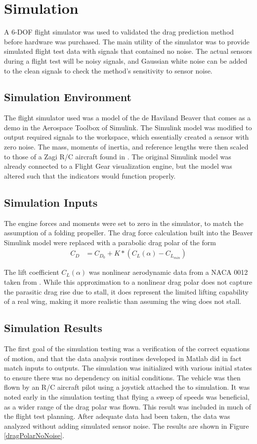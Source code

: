 \chapter{Simulation}
\label{simulation}
A 6-DOF flight simulator was used to validated the drag prediction method before hardware was purchased. The main utility of the simulator was to provide simulated flight test data with signals that contained no noise. The actual sensors during a flight test will be noisy signals, and Gaussian white noise can be added to the clean signals to check the method's sensitivity to sensor noise.

\section{Simulation Environment}
The flight simulator used was a model of the de Haviland Beaver that comes as a demo in the Aerospace Toolbox of Simulink. The Simulink model was modified to output required signals to the workspace, which essentially created a sensor with zero noise. The mass, moments of inertia, and reference lengths were then scaled to those of a Zagi R/C aircraft found in \cite{stevens2003aircraft}. The original Simulink model was already connected to a Flight Gear visualization engine, but the model was altered such that the indicators would function properly.

\section{Simulation Inputs}
The engine forces and moments were set to zero in the simulator, to match the assumption of a folding propeller.
The drag force calculation built into the Beaver Simulink model were replaced with a parabolic drag polar of the form
\begin{align}
C_D &= C_{D_0} + K*(C_L(\alpha)-C_{L_{min}})
\end{align}

The lift coefficient $C_L(\alpha)$ was nonlinear aerodynamic data from a NACA 0012 taken from \cite{osborne2007transitions}. While this approximation to a nonlinear drag polar does not capture the parasitic drag rise due to stall, it does represent the limited lifting capability of a real wing, making it more realistic than assuming the wing does not stall.
\section{Simulation Results}
The first goal of the simulation testing was a verification of the correct equations of motion, and that the data analysis routines developed in Matlab did in fact match inputs to outputs. The simulation was initialized with various initial states to ensure there was no dependency on initial conditions. The vehicle was then flown by an R/C aircraft pilot using a joystick attached the to simulation. It was noted early in the simulation testing that flying a sweep of speeds was beneficial, as a wider range of the drag polar was flown. This result was included in much of the flight test planning. After adequate data had been taken, the data was analyzed without adding simulated sensor noise. The results are shown in Figure \ref{dragPolarNoNoise}.

